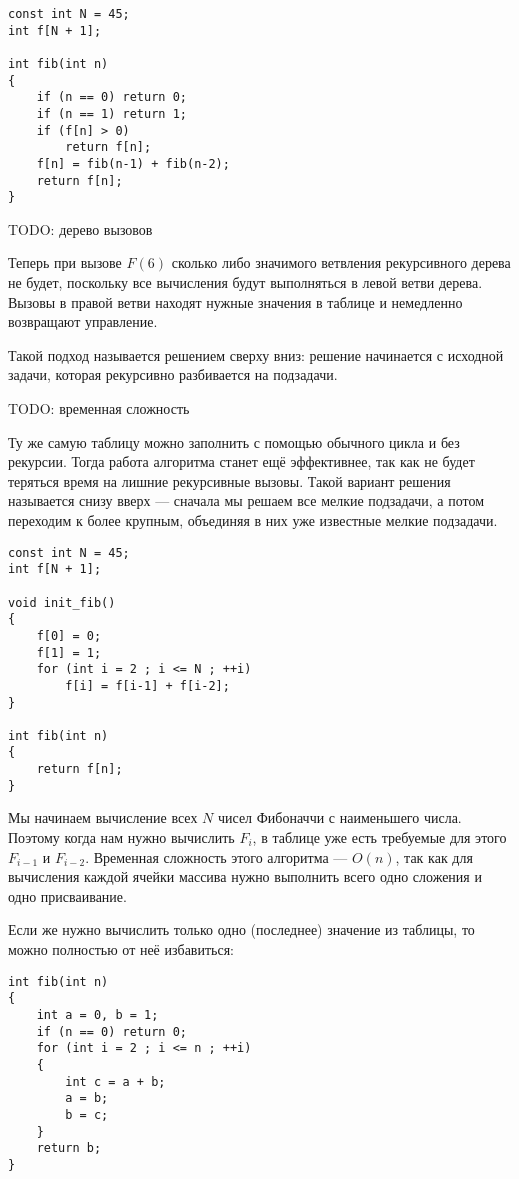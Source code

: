\documentclass[14pt,openany]{book}
\begin{document}
\begin{lstlisting}
const int N = 45;
int f[N + 1];

int fib(int n)
{
    if (n == 0) return 0;
    if (n == 1) return 1;
    if (f[n] > 0)
        return f[n];
    f[n] = fib(n-1) + fib(n-2);
    return f[n];
}
\end{lstlisting}

TODO: дерево вызовов

Теперь при вызове $F(6)$ сколько либо значимого ветвления рекурсивного дерева не будет,
поскольку все вычисления будут выполняться в левой ветви дерева. Вызовы в правой ветви
находят нужные значения в таблице и немедленно возвращают управление.

Такой подход называется решением сверху вниз: решение начинается с исходной задачи, которая 
рекурсивно разбивается на подзадачи.

TODO: временная сложность

Ту же самую таблицу можно заполнить с помощью обычного цикла и без рекурсии.
Тогда работа алгоритма станет ещё эффективнее, так как не будет теряться время на
лишние рекурсивные вызовы.
Такой вариант решения называется снизу вверх --- сначала мы решаем все мелкие подзадачи,
а потом переходим к более крупным, объединяя в них уже известные мелкие подзадачи.

\begin{lstlisting}
const int N = 45;
int f[N + 1];

void init_fib()
{
    f[0] = 0;
    f[1] = 1;
    for (int i = 2 ; i <= N ; ++i)
        f[i] = f[i-1] + f[i-2];
}

int fib(int n)
{
    return f[n];
}
\end{lstlisting}

Мы начинаем вычисление всех $N$ чисел Фибоначчи с наименьшего числа. Поэтому когда нам
нужно вычислить $F_i$, в таблице уже есть требуемые для этого $F_{i-1}$ и $F_{i-2}$.
Временная сложность этого алгоритма --- $O(n)$, так как для вычисления каждой ячейки
массива нужно выполнить всего одно сложения и одно присваивание.

Если же нужно вычислить только одно (последнее) значение из таблицы, то можно полностью
от неё избавиться:

\begin{lstlisting}
int fib(int n)
{
    int a = 0, b = 1;
    if (n == 0) return 0;
    for (int i = 2 ; i <= n ; ++i)
    {
        int c = a + b;
        a = b;
        b = c;
    }
    return b;
}
\end{lstlisting}
\end{document}
